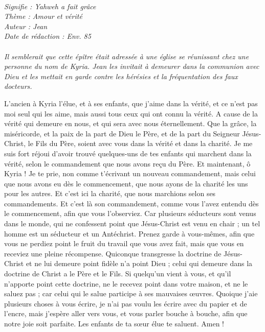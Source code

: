 \BFont
\noindent\hrulefill
{\footnotesize
\textit{
\bigskip
{\centering{}
\\Signifie : Yahweh a fait grâce
\\Thème : Amour et vérité
\\Auteur : Jean
\\Date de rédaction : Env. 85\\}
}
\textit{
\\Il semblerait que cette épître était adressée à une église se réunissant chez une personne du nom de Kyria. Jean les invitait à demeurer dans la communion avec Dieu et les mettait en garde contre les hérésies et la fréquentation des faux docteurs.\bigskip
}
}
\par\nobreak\noindent\hrulefill
\begin{multicols}{2}
\TextTitle{[Introduction]}
\VerseOne{}L'ancien à Kyria l’élue, et à ses enfants, que j'aime dans la vérité, et ce n’est pas moi seul qui les aime, mais aussi tous ceux qui ont connu la vérité.
A cause de la vérité qui demeure en nous, et qui sera avec nous éternellement.
Que la grâce, la miséricorde, et la paix de la part de Dieu le Père, et de la part du Seigneur Jésus-Christ, le Fils du Père, soient avec vous dans la vérité et dans la charité.
Je me suis fort réjoui d'avoir trouvé quelques-uns de tes enfants qui marchent dans la vérité, selon le commandement que nous avons reçu du Père.
Et maintenant, ô Kyria ! Je te prie, non comme t'écrivant un nouveau commandement, mais celui que nous avons eu dès le commencement, que nous ayons de la charité les uns pour les autres.
Et c'est ici la charité, que nous marchions selon ses commandements. Et c'est là son commandement, comme vous l'avez entendu dès le commencement, afin que vous l'observiez.
Car plusieurs séducteurs sont venus dans le monde, qui ne confessent point que Jésus-Christ est venu en chair ; un tel homme est un séducteur et un Antéchrist.
Prenez garde à vous-mêmes, afin que vous ne perdiez point le fruit du travail que vous avez fait, mais que vous en receviez une pleine récompense.
Quiconque transgresse la doctrine de Jésus-Christ et ne lui demeure point fidèle n'a point Dieu ; celui qui demeure dans la doctrine de Christ a le Père et le Fils.
Si quelqu'un vient à vous, et qu'il n'apporte point cette doctrine, ne le recevez point dans votre maison, et ne le saluez pas ;
car celui qui le salue participe à ses mauvaises œuvres.
\TextTitle{[Conclusion]}
Quoique j’aie plusieurs choses à vous écrire, je n’ai pas voulu les écrire avec du papier et de l'encre, mais j'espère aller vers vous, et vous parler bouche à bouche, afin que notre joie soit parfaite.
Les enfants de ta sœur élue te saluent. Amen !
\PPE{}
\end{multicols}

